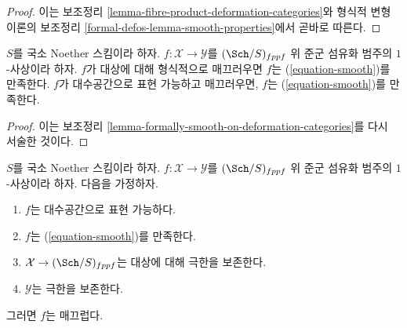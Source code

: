 \begin{proof}
이는 보조정리 \ref{lemma-fibre-product-deformation-categories}와
형식적 변형 이론의 보조정리
\ref{formal-defos-lemma-smooth-properties}에서 곧바로 따른다.
\end{proof}

\begin{lemma}
\label{lemma-smooth-smooth}
$S$를 국소 Noether 스킴이라 하자.
$f : \mathcal{X} \to \mathcal{Y}$를 $(\Sch/S)_{fppf}$ 위 준군 섬유화
범주의 $1$-사상이라 하자. $f$가 대상에 대해 형식적으로 매끄러우면
$f$는 (\ref{equation-smooth})를 만족한다. $f$가 대수공간으로 표현
가능하고 매끄러우면, $f$는 (\ref{equation-smooth})를 만족한다.
\end{lemma}

\begin{proof}
이는 보조정리 \ref{lemma-formally-smooth-on-deformation-categories}를
다시 서술한 것이다.
\end{proof}

\begin{lemma}
\label{lemma-implies-smooth}
$S$를 국소 Noether 스킴이라 하자.
$f : \mathcal{X} \to \mathcal{Y}$를 $(\Sch/S)_{fppf}$ 위
준군 섬유화 범주의 $1$-사상이라 하자. 다음을 가정하자.
\begin{enumerate}
\item $f$는 대수공간으로 표현 가능하다.
\item $f$는 (\ref{equation-smooth})를 만족한다.
\item $\mathcal{X} \to (\Sch/S)_{fppf}$는 대상에 대해 극한을 보존한다.
\item $\mathcal{Y}$는 극한을 보존한다.
\end{enumerate}
그러면 $f$는 매끄럽다.
\end{lemma}

